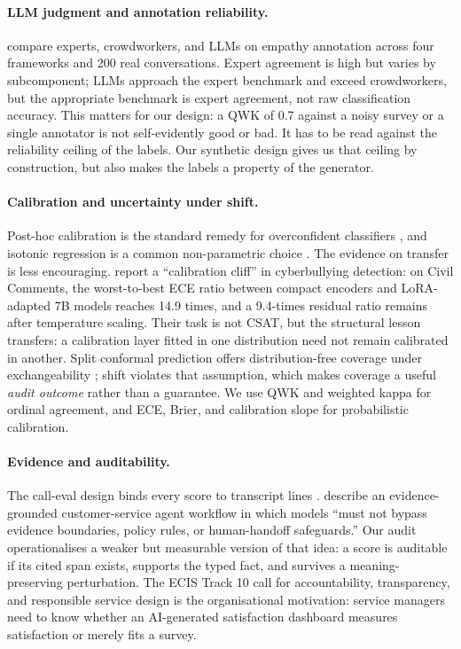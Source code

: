 \documentclass[11pt,a4paper]{article}
\begin{document}
\paragraph{LLM judgment and annotation reliability.}
\citet{kumar2026empathic} compare experts, crowdworkers, and LLMs on empathy annotation across
four frameworks and 200 real conversations. Expert agreement is high but varies by subcomponent;
LLMs approach the expert benchmark and exceed crowdworkers, but the appropriate benchmark is
expert agreement, not raw classification accuracy. This matters for our design: a QWK of 0.7
against a noisy survey or a single annotator is not self-evidently good or bad. It has to be
read against the reliability ceiling of the labels. Our synthetic design gives us that ceiling
by construction, but also makes the labels a property of the generator.

\paragraph{Calibration and uncertainty under shift.}
Post-hoc calibration is the standard remedy for overconfident classifiers
\citep{guo2017calibration}, and isotonic regression is a common non-parametric choice
\citep{niculescu2005predicting}. The evidence on transfer is less encouraging.
\citet{wang2026care} report a ``calibration cliff'' in cyberbullying detection: on Civil Comments,
the worst-to-best ECE ratio between compact encoders and LoRA-adapted 7B models reaches 14.9
times, and a 9.4-times residual ratio remains after temperature scaling. Their task is not CSAT,
but the structural lesson transfers: a calibration layer fitted in one distribution need not
remain calibrated in another. Split conformal prediction offers distribution-free coverage under
exchangeability \citep{angelopoulos2021gentle}; shift violates that assumption, which makes
coverage a useful \emph{audit outcome} rather than a guarantee. We use QWK and weighted kappa
\citep{cohen1968weighted} for ordinal agreement, and ECE, Brier, and calibration slope for
probabilistic calibration.

\paragraph{Evidence and auditability.}
The call-eval design binds every score to transcript lines \citep{calleval2026,jevlist2026}.
\citet{wu2026evidence} describe an evidence-grounded customer-service agent workflow in which
models ``must not bypass evidence boundaries, policy rules, or human-handoff safeguards.'' Our
audit operationalises a weaker but measurable version of that idea: a score is auditable if its
cited span exists, supports the typed fact, and survives a meaning-preserving perturbation. The
ECIS Track 10 call for accountability, transparency, and responsible service design
\citep{ecis2027track10} is the organisational motivation: service managers need to know whether
an AI-generated satisfaction dashboard measures satisfaction or merely fits a survey.
\end{document}
